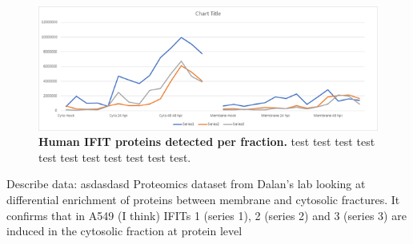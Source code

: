 \begin{figure}
    \centering
    \includegraphics[width=1\linewidth]{06. Chapter 1/Figs/02. Expression/04. proteomics.png}
    \caption[Human IFIT proteins detected per fraction.]{\textbf{Human IFIT proteins detected per fraction.} test test test test test test test test test test test.}
    \label{Human IFIT proteins detected per fraction.}
\end{figure}

Describe data: \newline
asdasdasd \newline
Proteomics dataset from Dalan’s lab looking at differential enrichment of proteins between membrane and cytosolic fractures. It confirms that in A549 (I think) IFITs 1 (series 1), 2 (series 2) and 3 (series 3) are induced in the cytosolic fraction at protein level 







